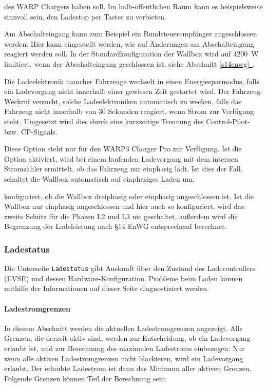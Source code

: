 \documentclass[a4paper,10pt]{article}
\newcommand*{\fullref}[1]{Abschnitt \hyperref[{#1}]{\ref*{#1}~\nameref*{#1}}}
\begin{document}
\begin{multicols*}{2}
\begin{description}[labelindent=0.5cm, leftmargin=0.5cm]
     des WARP Chargers haben soll. Im halb-öffentlichen Raum kann es beispielsweise sinnvoll sein,
     den Ladestop per Taster zu verbieten.
     \item[Abschalteingang] Am Abschalteingang kann zum Beispiel ein Rundsteuerempfänger angeschlossen werden.
     Hier kann eingestellt werden, wie auf Änderungen am Abschalteingang
	 reagiert werden soll. In der Standardkonfiguration der Wallbox wird auf \SI{4200}{\watt} limitiert, wenn der Abschalteingang geschlossen ist, siehe \fullref{s14enwg}.
     \item[Fahrzeug-Weckruf] Die Ladeelektronik mancher Fahrzeuge wechselt in
	 einen Energiesparmodus, falls ein Ladevorgang nicht innerhalb einer
	 gewissen Zeit gestartet wird. Der Fahrzeug-Weckruf versucht, solche Ladeelektroniken automatisch zu wecken, falls das Fahrzeug nicht innerhalb von 30 Sekunden reagiert, wenn Strom zur Verfügung steht. Umgesetzt wird dies durch eine kurzzeitige Trennung des Control-Pilot- bzw. CP-Signals.
	 \item[Automatischer Phasenwechsel] Diese Option steht nur für den WARP3
	 Charger Pro zur Verfügung. Ist die Option aktiviert, wird bei einem
	 laufenden Ladevorgang mit dem internen Stromzähler ermittelt, ob das
	 Fahrzeug nur einphasig lädt.
	 Ist dies der Fall, schaltet die Wallbox automatisch auf einphasiges
	 Laden um.
	 \item[Zuleitung] konfiguriert, ob die Wallbox
	 dreiphasig oder einphasig angeschlossen ist. Ist die
	 Wallbox nur einphasig angeschlossen und hier auch so konfiguriert, wird das zweite
	 Schütz für die Phasen L2 und L3 nie geschaltet, außerdem wird die Begrenzung der Ladeleistung nach \S14 EnWG entsprechend berechnet.
    \end{description}

    \subsubsection{Ladestatus}\label{evse}
    Die Unterseite \texttt{Ladestatus} gibt Auskunft über den Zustand
    des Ladecontrollers (EVSE) und dessen Hardware-Konfiguration. Probleme beim Laden
    können mithilfe der Informationen auf dieser Seite diagnostiziert werden.

    \paragraph{Ladestromgrenzen}
    In diesem Abschnitt werden die aktuellen Ladestromgrenzen angezeigt. Alle Grenzen, die
    derzeit aktiv sind, werden zur Entscheidung, ob ein Ladevorgang erlaubt ist, und zur Berechnung des maximalen Ladestroms einbezogen:
    Nur wenn alle aktiven Ladestromgrenzen nicht blockieren, wird ein Ladevorgang erlaubt.
    Der erlaubte Ladestrom ist dann das Minimum aller aktiven Grenzen. Folgende Grenzen können Teil der Berechnung sein:


\end{multicols*}
\end{document}
